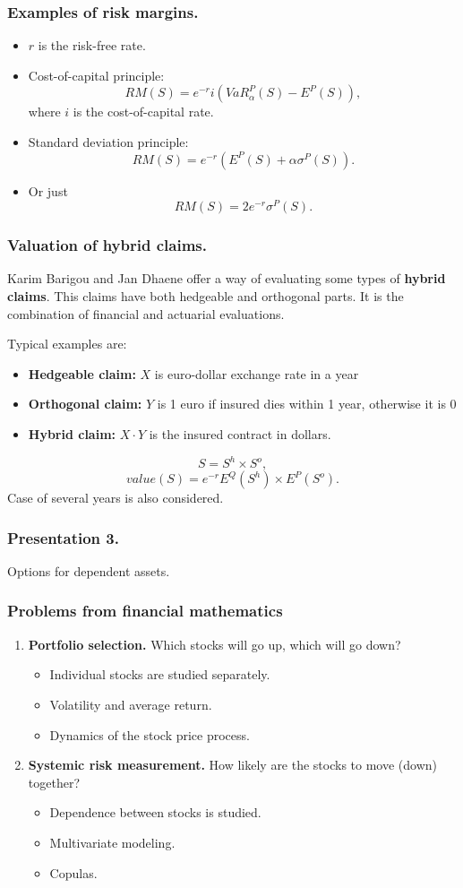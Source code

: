 \documentclass{beamer}
\begin{document}
\begin{frame}[fragile]
\frametitle{Examples of risk margins.}
\begin{itemize}
\item $r$ is the risk-free rate.
\item Cost-of-capital principle:
$$RM(S) = e^{-r}i(VaR^P_{\alpha}(S) - E^P(S)),$$
where $i$ is the cost-of-capital rate.
\item Standard deviation principle:
$$RM(S) = e^{-r}(E^P(S) + \alpha \sigma^P(S)).$$
\item Or just
$$RM(S) = 2e^{-r}\sigma^P(S).$$
\end{itemize}
\end{frame}
\begin{frame}[fragile]
\frametitle{Valuation of hybrid claims.}
Karim Barigou and Jan Dhaene offer a way of evaluating some types of \textbf{hybrid claims}. This claims have both hedgeable and orthogonal parts. It is the combination of financial and actuarial evaluations.

Typical examples are:
\begin{itemize}
\item \textbf{Hedgeable claim:} $X$ is euro-dollar exchange rate in a year
\item \textbf{Orthogonal claim:} $Y$ is 1 euro if insured dies within 1 year, otherwise it is 0
\item \textbf{Hybrid claim:} $X\cdot Y$ is the insured contract in dollars.
\end{itemize}
$$S = S^h\times S^o,$$
$$value(S) = e^{-r} E^Q(S^h)\times E^P(S^o).$$
Case of several years is also considered.
\end{frame}
\begin{frame}[fragile]
\frametitle{Presentation 3.}
\begin{center}
\Large{Options for dependent assets.}
\end{center}
\end{frame}
\begin{frame}[fragile]
\frametitle{Problems from financial mathematics}
\begin{enumerate}
	\item \textbf{Portfolio selection.} Which stocks will go up, which will go down?
	
	\begin{itemize}
		\item 	Individual stocks are studied separately.
    \item Volatility and average return.
		\item Dynamics of the stock price process.
	\end{itemize}
	\item \textbf{Systemic risk measurement.} How likely are the stocks to move (down) together?
	
\begin{itemize}
	\item 	Dependence between stocks is studied.
\item Multivariate modeling.
\item Copulas.
\end{itemize}
\end{enumerate}
\end{frame}
\end{document}
